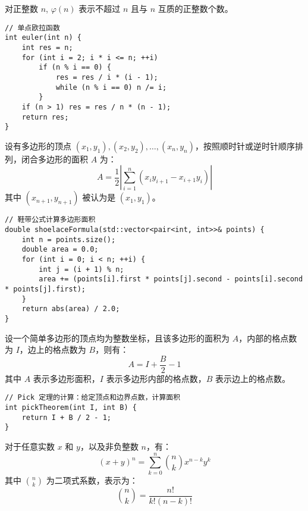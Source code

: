 \begin{definition}[欧拉函数]
对正整数 $n$, $\varphi(n)$ 表示不超过 $n$ 且与 $n$ 互质的正整数个数。
\end{definition}

\begin{lstlisting}
// 单点欧拉函数
int euler(int n) {
    int res = n;
    for (int i = 2; i * i <= n; ++i)
        if (n % i == 0) {
            res = res / i * (i - 1);
            while (n % i == 0) n /= i;
        }
    if (n > 1) res = res / n * (n - 1);
    return res;
}
\end{lstlisting}

\begin{theorem}[鞋带公式]
设有多边形的顶点 $(x_1, y_1), (x_2, y_2), \dots, (x_n, y_n)$，按照顺时针或逆时针顺序排列，闭合多边形的面积 $A$ 为：
\[
A = \frac{1}{2} \left| \sum_{i=1}^{n} (x_i y_{i+1} - x_{i+1} y_i) \right|
\]
其中 $(x_{n+1}, y_{n+1})$ 被认为是 $(x_1, y_1)$。
\end{theorem}

\begin{lstlisting}
// 鞋带公式计算多边形面积
double shoelaceFormula(std::vector<pair<int, int>>& points) {
    int n = points.size();
    double area = 0.0;
    for (int i = 0; i < n; ++i) {
        int j = (i + 1) % n;
        area += (points[i].first * points[j].second - points[i].second * points[j].first);
    }
    return abs(area) / 2.0;
}
\end{lstlisting}

\begin{theorem}[Pick 定理]
设一个简单多边形的顶点均为整数坐标，且该多边形的面积为 $A$，内部的格点数为 $I$，边上的格点数为 $B$，则有：
\[
A = I + \frac{B}{2} - 1
\]
其中 $A$ 表示多边形面积，$I$ 表示多边形内部的格点数，$B$ 表示边上的格点数。
\end{theorem}

\begin{lstlisting}
// Pick 定理的计算：给定顶点和边界点数，计算面积
int pickTheorem(int I, int B) {
    return I + B / 2 - 1;
}
\end{lstlisting}

\begin{theorem}[二项式定理]
对于任意实数 $x$ 和 $y$，以及非负整数 $n$，有：
\[
(x + y)^n = \sum_{k=0}^{n} \binom{n}{k} x^{n-k} y^k
\]
其中 $\binom{n}{k}$ 为二项式系数，表示为：
\[
\binom{n}{k} = \frac{n!}{k!(n-k)!}
\]
\end{theorem}

